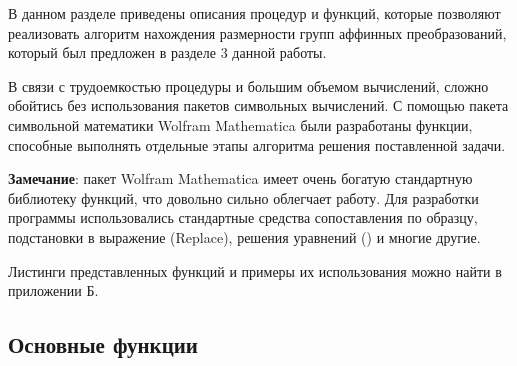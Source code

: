 \documentclass[../main.tex]{subfiles}
\begin{document}
В данном разделе приведены описания процедур и функций, которые позволяют реализовать алгоритм нахождения размерности групп аффинных преобразований, который был предложен в разделе 3 данной работы. 

В связи с трудоемкостью процедуры и большим объемом вычислений, сложно обойтись без использования пакетов символьных вычислений. С помощью пакета символьной математики {\ttfamily Wolfram Mathematica} были разработаны функции, способные выполнять отдельные этапы алгоритма решения поставленной задачи.

\textbf{Замечание}: пакет {\ttfamily Wolfram Mathematica} имеет очень богатую {стандартную} библиотеку функций, что довольно сильно облегчает работу. Для разработки программы использовались стандартные средства сопоставления по образцу, подстановки в выражение ({\ttfamily Replace}), решения уравнений ({}) и многие другие.

Листинги представленных функций и примеры их использования можно найти в приложении Б.

\subsection{Основные функции}
\end{document}
